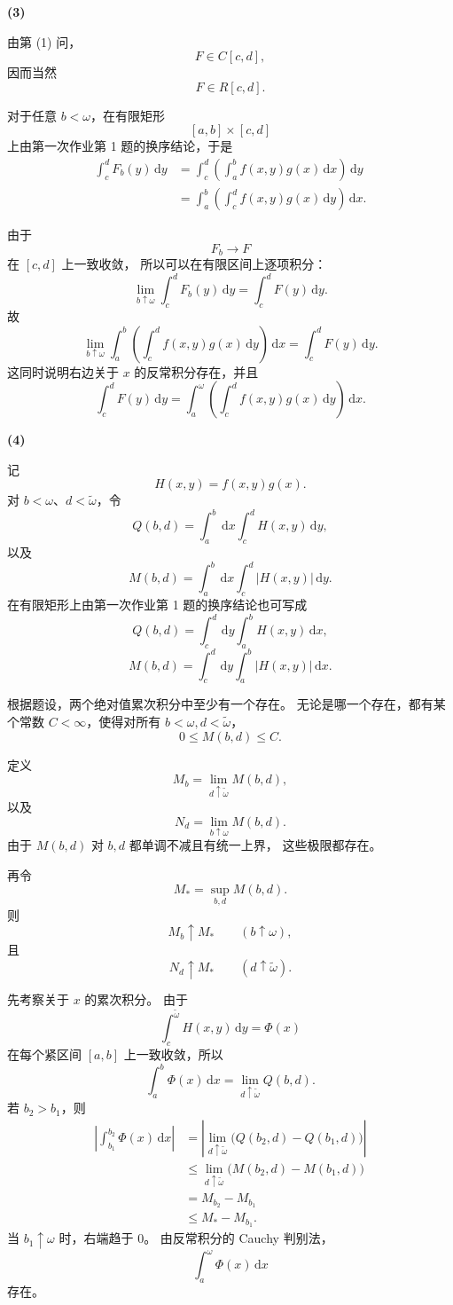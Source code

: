 \documentclass[12pt,a4paper]{ctexart}
\newcommand{\dd}{\,\mathrm d}
\begin{document}
\medskip

\noindent
\textbf{(3)}

由第 (1) 问，
\[
F\in C[c,d],
\]
因而当然
\[
F\in R[c,d].
\]

对于任意 \(b<\omega\)，在有限矩形
\[
[a,b]\times[c,d]
\]
上由第一次作业第 1 题的换序结论，于是
\begin{align*}
\int_c^dF_b(y)\dd y
&=
\int_c^d
\left(
\int_a^b f(x,y)g(x)\dd x
\right)\dd y\\
&=
\int_a^b
\left(
\int_c^d f(x,y)g(x)\dd y
\right)\dd x.
\end{align*}

由于
\[
F_b\longrightarrow F
\]
在 \([c,d]\) 上一致收敛，
所以可以在有限区间上逐项积分：
\[
\lim_{b\uparrow\omega}
\int_c^dF_b(y)\dd y
=
\int_c^dF(y)\dd y.
\]
故
\[
\lim_{b\uparrow\omega}
\int_a^b
\left(
\int_c^d f(x,y)g(x)\dd y
\right)\dd x
=
\int_c^dF(y)\dd y.
\]
这同时说明右边关于 \(x\) 的反常积分存在，并且
\[
\boxed{
\int_c^dF(y)\dd y
=
\int_a^\omega
\left(
\int_c^d f(x,y)g(x)\dd y
\right)\dd x.
}
\]

\medskip

\noindent
\textbf{(4)}

记
\[
H(x,y)=f(x,y)g(x).
\]
对 \(b<\omega\)、\(d<\widetilde\omega\)，令
\[
Q(b,d)
=
\int_a^b\dd x\int_c^dH(x,y)\dd y,
\]
以及
\[
M(b,d)
=
\int_a^b\dd x\int_c^d|H(x,y)|\dd y.
\]
在有限矩形上由第一次作业第 1 题的换序结论也可写成
\[
Q(b,d)
=
\int_c^d\dd y\int_a^bH(x,y)\dd x,
\]
\[
M(b,d)
=
\int_c^d\dd y\int_a^b|H(x,y)|\dd x.
\]

根据题设，两个绝对值累次积分中至少有一个存在。
无论是哪一个存在，都有某个常数 \(C<\infty\)，使得对所有
\(b<\omega,d<\widetilde\omega\)，
\[
0\le M(b,d)\le C.
\]

定义
\[
M_b
=
\lim_{d\uparrow\widetilde\omega}M(b,d),
\]
以及
\[
N_d
=
\lim_{b\uparrow\omega}M(b,d).
\]
由于 \(M(b,d)\) 对 \(b,d\) 都单调不减且有统一上界，
这些极限都存在。

再令
\[
M_*=\sup_{b,d}M(b,d).
\]
则
\[
M_b\uparrow M_*
\qquad (b\uparrow\omega),
\]
且
\[
N_d\uparrow M_*
\qquad (d\uparrow\widetilde\omega).
\]

先考察关于 \(x\) 的累次积分。
由于
\[
\int_c^{\widetilde\omega}H(x,y)\dd y=\Phi(x)
\]
在每个紧区间 \([a,b]\) 上一致收敛，所以
\[
\int_a^b\Phi(x)\dd x
=
\lim_{d\uparrow\widetilde\omega}Q(b,d).
\]
若 \(b_2>b_1\)，则
\begin{align*}
\left|
\int_{b_1}^{b_2}\Phi(x)\dd x
\right|
&=
\left|
\lim_{d\uparrow\widetilde\omega}
\bigl(Q(b_2,d)-Q(b_1,d)\bigr)
\right|\\
&\le
\lim_{d\uparrow\widetilde\omega}
\bigl(M(b_2,d)-M(b_1,d)\bigr)\\
&=
M_{b_2}-M_{b_1}\\
&\le
M_*-M_{b_1}.
\end{align*}
当 \(b_1\uparrow\omega\) 时，右端趋于 \(0\)。
由反常积分的 Cauchy 判别法，
\[
\int_a^\omega\Phi(x)\dd x
\]
存在。
\end{document}

